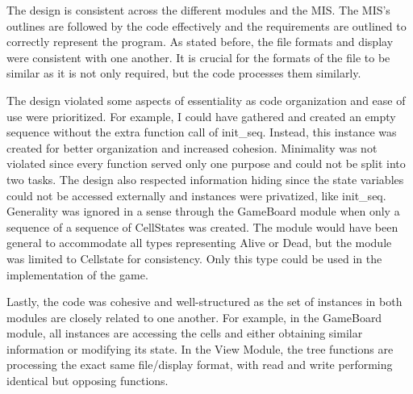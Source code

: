 \documentclass[12pt]{article}
\begin{document}
The design is consistent across the different modules and the MIS. The MIS's outlines are followed by the code effectively and the requirements are outlined to correctly represent the program. As stated before, the file formats and display were consistent with one another. It is crucial for the formats of the file to be similar as it is not only required, but the code processes them similarly.

The design violated some aspects of essentiality as code organization and ease of use were prioritized. For example, I could have gathered and created an empty sequence without the extra function call of init\_seq. Instead, this instance was created for better organization and increased cohesion. Minimality was not violated since every function served only one purpose and could not be split into two tasks. The design also respected information hiding since the state variables could not be accessed externally and instances were privatized, like init\_seq. Generality was ignored in a sense through the GameBoard module when only a sequence of a sequence of CellStates was created. The module would have been general to accommodate all types representing Alive or Dead, but the module was limited to Cellstate for consistency. Only this type could be used in the implementation of the game.

Lastly, the code was cohesive and well-structured as the set of instances in both modules are closely related to one another. For example, in the GameBoard module, all instances are accessing the cells and either obtaining similar information or modifying its state. In the View Module, the tree functions are processing the exact same file/display format, with read and write performing identical but opposing functions. 

 
\end{document}
